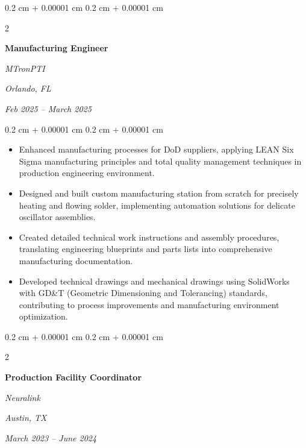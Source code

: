 \documentclass[10pt, letterpaper]{article}
\newenvironment{highlights}{
    \begin{itemize}[
        topsep=0.10 cm,
        parsep=0.10 cm,
        partopsep=0pt,
        itemsep=0pt,
        leftmargin=0.4 cm + 10pt
    ]
}{
    \end{itemize}
} %
\newenvironment{onecolentry}{
    \begin{adjustwidth}{
        0.2 cm + 0.00001 cm
    }{
        0.2 cm + 0.00001 cm
    }
}{
    \end{adjustwidth}
} %
\newenvironment{twocolentry}[2][]{
    \onecolentry
    \def\secondColumn{#2}
    \setcolumnwidth{\fill, 4.5 cm}
    \begin{paracol}{2}
}{
    \switchcolumn \raggedleft \secondColumn
    \end{paracol}
    \endonecolentry
} %
\begin{document}
        \vspace{0.35 cm}

        \begin{twocolentry}{
        \textit{Orlando, FL}    
            
        \textit{Feb 2025 – March 2025}}
            \textbf{Manufacturing Engineer}
            
            \textit{MTronPTI}
        \end{twocolentry}

        \vspace{0.10 cm}
        \begin{onecolentry}
            \begin{highlights}
                \item Enhanced manufacturing processes for DoD suppliers, applying LEAN Six Sigma manufacturing principles and total quality management techniques in production engineering environment.
                \item Designed and built custom manufacturing station from scratch for precisely heating and flowing solder, implementing automation solutions for delicate oscillator assemblies.
                \item Created detailed technical work instructions and assembly procedures, translating engineering blueprints and parts lists into comprehensive manufacturing documentation.
                \item Developed technical drawings and mechanical drawings using SolidWorks with GD\&T (Geometric Dimensioning and Tolerancing) standards, contributing to process improvements and manufacturing environment optimization.
            \end{highlights}
        \end{onecolentry}


        \vspace{0.35 cm}

        \begin{twocolentry}{
        \textit{Austin, TX}    
            
        \textit{March 2023 – June 2024}}
            \textbf{Production Facility Coordinator}
            
            \textit{Neuralink}
        \end{twocolentry}
\end{document}
